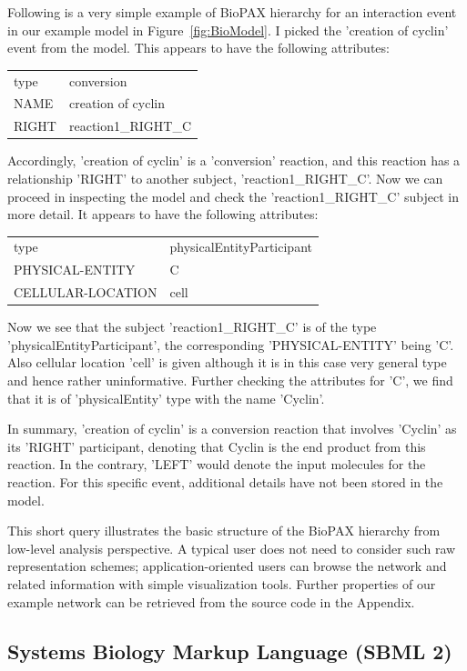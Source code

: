 \documentclass[a4paper,10pt,titlepage]{article}
\begin{document}
Following is a very simple example of BioPAX hierarchy for an interaction event in our example model in Figure~\ref{fig:BioModel}. I picked the 'creation of cyclin' event from the model. This appears to have the following attributes: 

\begin{tabular}{ll}
type 		&conversion\\
NAME 		&creation of cyclin\\
RIGHT	 	&reaction1\_RIGHT\_C
\end{tabular}

Accordingly, 'creation of cyclin' is a 'conversion' reaction, and this reaction has a relationship 'RIGHT' to another subject, 'reaction1\_RIGHT\_C'. Now we can proceed in inspecting the model and check the 'reaction1\_RIGHT\_C' subject in more detail. It appears to have the following attributes:

\begin{tabular}{ll}
type			&physicalEntityParticipant\\
PHYSICAL-ENTITY		&C\\
CELLULAR-LOCATION	&cell
\end{tabular}

Now we see that the subject 'reaction1\_RIGHT\_C' is of the type 'physicalEntityParticipant', the corresponding 'PHYSICAL-ENTITY' being 'C'. Also cellular location 'cell' is given although it is in this case very general type and hence rather uninformative. Further checking the attributes for 'C', we find that it is of 'physicalEntity' type with the name 'Cyclin'. 

In summary, 'creation of cyclin' is a conversion reaction that involves 'Cyclin' as its 'RIGHT' participant, denoting that Cyclin is the end product from this reaction. In the contrary, 'LEFT' would denote the input molecules for the reaction. For this specific event, additional details have not been stored in the model. 

This short query illustrates the basic structure of the BioPAX hierarchy from low-level analysis perspective. A typical user does not need to consider such raw representation schemes; application-oriented users can browse the network and related information with simple visualization tools. Further properties of our example network can be retrieved from the source code in the Appendix.

\subsection{Systems Biology Markup Language (SBML 2)}
\end{document}
